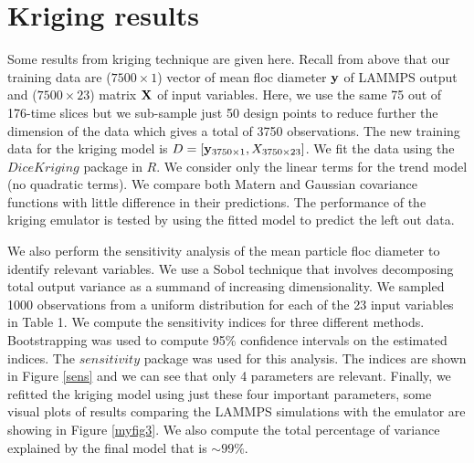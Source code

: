 \documentclass[12pt,titlepage]{report}
\newcommand{\bX}{{\bf X}}
\newcommand{\by}{{\bf y}}
\theoremstyle{definition}
\theoremstyle{remark}
\begin{document}
\section{Kriging results}
Some results from kriging technique are given here. Recall from above that our training data are ($7500 \times 1$) vector of mean floc diameter $\by$ of LAMMPS output and ($7500 \times 23$) matrix $\bX$ of input variables. Here, we use the same 75 out of 176-time slices but we sub-sample just 50 design points to reduce further the dimension of the data which gives a total of 3750 observations. The new training data for the kriging model is $D=[\by_{3750 \times 1}, X_{3750 \times 23}]$. We fit the data using the $DiceKriging$ package in $R$. We consider only the linear terms for the trend model (no quadratic terms). We compare both Matern and Gaussian covariance functions with little difference in their predictions. The performance of the kriging emulator is tested by using the fitted model to predict the left out data. 

We also perform the sensitivity analysis of the mean particle floc diameter to identify relevant variables. We use a Sobol technique that involves decomposing total output variance as a summand of increasing dimensionality. We sampled 1000 observations from a uniform distribution for each of the 23 input variables in Table 1. We compute the sensitivity indices for three different methods. Bootstrapping was used to compute 95\% confidence intervals on the estimated indices.  The $sensitivity$ package was used for this analysis. The indices are shown in Figure \ref{sens} and we can see that only 4 parameters are relevant. Finally, we refitted the kriging model using just these four important parameters, some visual plots of results comparing the LAMMPS simulations with the emulator are showing in Figure \ref{myfig3}. We also compute the total percentage of variance explained by the final model that is $\sim 99\%$.
\end{document}
